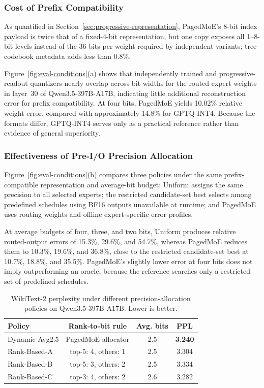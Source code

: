 \documentclass[sigconf, nonacm]{acmart}
\begin{document}
\subsubsection{Cost of Prefix Compatibility}
\label{sec:eval-quantizer-quality}

As quantified in Section~\ref{sec:progressive-representation},
PagedMoE's 8-bit index payload is twice that of a fixed-4-bit
representation, but one copy exposes all 1--8-bit levels instead of the
36 bits per weight required by independent variants; tree-codebook
metadata adds less than 0.8\%.

Figure~\ref{fig:eval-conditions}(a) shows that independently trained
and progressive-readout quantizers nearly overlap across bit-widths
for the routed-expert weights in layer~30 of Qwen3.5-397B-A17B,
indicating little additional reconstruction error for prefix
compatibility. At four bits, PagedMoE yields 10.02\% relative weight
error, compared with approximately 14.8\% for GPTQ-INT4. Because the
formats differ, GPTQ-INT4 serves only as a practical reference rather
than evidence of general superiority.


\subsubsection{Effectiveness of Pre-I/O Precision Allocation}
\label{sec:eval-allocation}

Figure~\ref{fig:eval-conditions}(b) compares three policies under the
same prefix-compatible representation and average-bit budget:
Uniform assigns the same precision to all selected experts; the
restricted candidate-set best selects among predefined schedules using
BF16 outputs unavailable at runtime; and PagedMoE uses routing weights
and offline expert-specific error profiles.

At average budgets of four, three, and two bits, Uniform produces
relative routed-output errors of 15.3\%, 29.6\%, and 54.7\%, whereas
PagedMoE reduces them to 10.3\%, 19.6\%, and 36.8\%, close to the
restricted candidate-set best at 10.7\%, 18.8\%, and 35.5\%.
PagedMoE's slightly lower error at four bits does not imply outperforming
an oracle, because the reference searches only a restricted set of
predefined schedules.

\begin{table}[t]
\centering
\footnotesize
\setlength{\tabcolsep}{3.5pt}
\renewcommand{\arraystretch}{0.95}
\caption{WikiText-2 perplexity under different precision-allocation
policies on Qwen3.5-397B-A17B. Lower is better.}
\label{tab:qwen-allocation-ppl}
\begin{tabular}{@{}lccc@{}}
\toprule
\textbf{Policy} & \textbf{Rank-to-bit rule} &
\textbf{Avg. bits} & \textbf{PPL} \\
\midrule
Dynamic Avg2.5 & PagedMoE allocator  & 2.5 & \textbf{3.240} \\
Rank-Based-A & top-5: 4, others: 1 & 2.5 & 3.304 \\
Rank-Based-B & top-5: 3, others: 2 & 2.5 & 3.334 \\
Rank-Based-C & top-3: 4, others: 2 & 2.6 & 3.282 \\
\bottomrule
\end{tabular}
\end{table}
\end{document}
